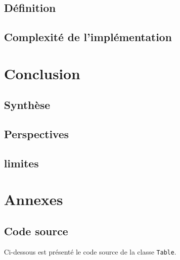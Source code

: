 \documentclass{article}
\begin{document}
    \subsection{Définition}\label{subsec:def}
    \subsection{Complexité de l'implémentation}\label{subsec:complexite}
    \section{Conclusion}\label{sec:conclusion}
    \subsection{Synthèse}\label{subsec:synthese}
    \subsection{Perspectives}\label{subsec:perspectives}
    \subsection{limites}\label{subsec:limites}
    \section{Annexes}\label{sec:annexes}
    \subsection{Code source}\label{subsec:code}

Ci-dessous est présenté le code source de la classe \texttt{Table}.
\end{document}

